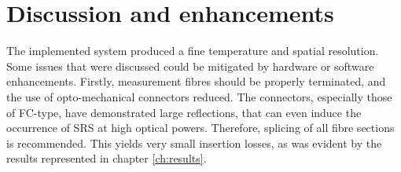 \documentclass{standalone}
\begin{document}
\chapter{Discussion and enhancements}
\setcounter{page}\thestranica


The implemented system produced a fine temperature and spatial resolution. Some issues that were discussed could be mitigated by hardware or software enhancements. Firstly, measurement fibres should be properly terminated, and the use of opto-mechanical connectors reduced. The connectors, especially those of FC-type, have demonstrated large reflections, that can even induce the occurrence of SRS at high optical powers. Therefore, splicing of all fibre sections is recommended. This yields very small insertion losses, as was evident by the results represented in chapter \ref{ch:results}. \\
\end{document}
